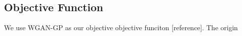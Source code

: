 \subsection{Objective Function}
We use WGAN-GP as our objective objective funciton [reference]. The origin